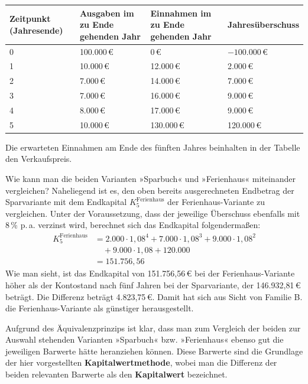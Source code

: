\begin{center}
  \centering
  \begin{tabular}{llll}
    \hline
    Zeitpunkt (Jahresende) & Ausgaben im zu Ende gehenden Jahr & Einnahmen im zu Ende gehenden Jahr & Jahresüberschuss\\
    \hline
    0 & 100.000\,€ & 0\,€ & $-100.000$\,€\\
    1 & 10.000\,€ & 12.000\,€ & 2.000\,€\\
    2 & 7.000\,€ & 14.000\,€ & 7.000\,€\\
    3 & 7.000\,€ & 16.000\,€ & 9.000\,€\\
    4 & 8.000\,€ & 17.000\,€ & 9.000\,€\\
    5 & 10.000\,€ & 130.000\,€ & 120.000\,€\\
    \hline
  \end{tabular}
\end{center}

Die erwarteten Einnahmen am Ende des fünften Jahres beinhalten in der Tabelle den Verkaufspreis.

Wie kann man die beiden Varianten »Sparbuch« und »Ferienhaus« miteinander vergleichen? Naheliegend ist es, den oben bereits ausgerechneten Endbetrag der Sparvariante mit dem Endkapital $K_5^{\text{Ferienhaus}}$ der Ferienhaus-Variante zu vergleichen. Unter der Voraussetzung, dass der jeweilige Überschuss ebenfalls mit 8\,\% p.\,a. verzinst wird, berechnet sich das Endkapital folgendermaßen:
\begin{align*}
  K_5^{\text{Ferienhaus}} &= 2.000 \cdot 1{,}08^4 + 7.000 \cdot 1{,}08^3 + 9.000 \cdot 1{,}08^2\\
  &\quad + 9.000 \cdot 1{,}08 + 120.000\\
  &= 151.756{,}56
\end{align*}
Wie man sieht, ist das Endkapital von 151.756{,}56\,€ bei der Ferienhaus-Variante höher als der Kontostand nach fünf Jahren bei der Sparvariante, der 146.932{,}81\,€ beträgt. Die Differenz beträgt 4.823{,}75\,€. Damit hat sich aus Sicht von Familie B. die Ferienhaus-Variante als günstiger herausgestellt.\beispielende

Aufgrund des Äquivalenzprinzips ist klar, dass man zum Vergleich der beiden zur Auswahl stehenden Varianten »Sparbuch« bzw. »Ferienhaus« ebenso gut die jeweiligen Barwerte hätte heranziehen können. Diese Barwerte sind die Grundlage der hier vorgestellten \textbf{Kapitalwertmethode}, wobei man die Differenz der beiden relevanten Barwerte als den \textbf{Kapitalwert} bezeichnet.

